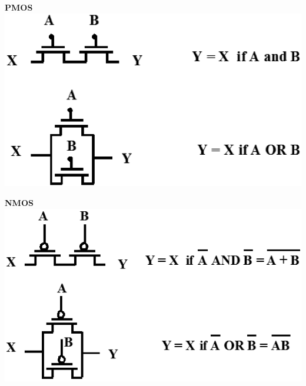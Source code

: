 \begin{minipage}[c]{0.45\columnwidth}
    \begin{center}
        \textbf{PMOS} \\
        \includegraphics[width=\columnwidth]{images/nmos_dualitaet.png}
    \end{center}
\end{minipage}
\hfill
\begin{minipage}[c]{0.45\columnwidth}
    \begin{center}
        \textbf{NMOS} \\
        \includegraphics[width=\columnwidth]{images/pmos_dualitaet.png}
    \end{center}
\end{minipage}

